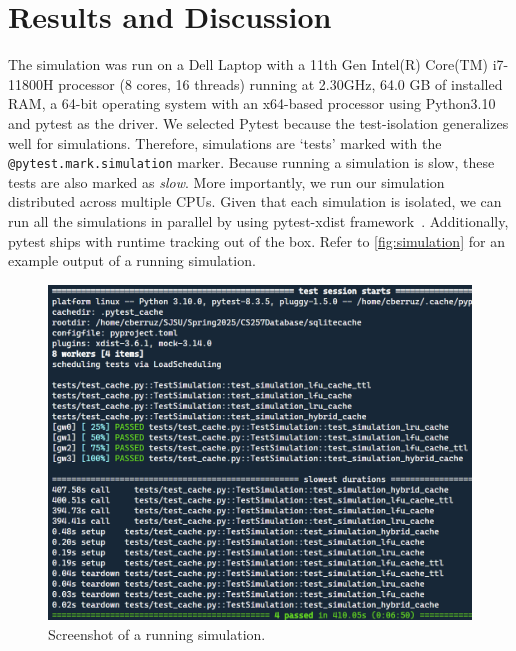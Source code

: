 
\section{Results and Discussion}
The simulation was run
on a Dell Laptop with a 11th Gen Intel(R) Core(TM) i7-11800H processor (8 cores, 16 threads)
running at 2.30GHz, 64.0 GB of installed RAM,
a 64-bit operating system with an x64-based processor
using Python3.10 and pytest as the driver.
We selected Pytest because the test-isolation generalizes
well for simulations. Therefore, simulations
are `tests' marked with the \texttt{@pytest.mark.simulation}
marker. Because running a simulation is slow,
these tests are also marked as \textit{slow}.
More importantly, we run our simulation
distributed across multiple CPUs. Given that
each simulation is isolated, we can run
all the simulations in parallel
by using pytest-xdist framework~\cite{pytestXdist}.
Additionally, pytest ships with runtime
tracking out of the box.
Refer to \autoref{fig:simulation}
for an example output of a running simulation.

\begin{figure}[!htp]
    \centering
    \includegraphics[width=\linewidth]{images/simulation_running_example.png}
    \caption{Screenshot of a running simulation.}
    \label{fig:simulation}
\end{figure}


